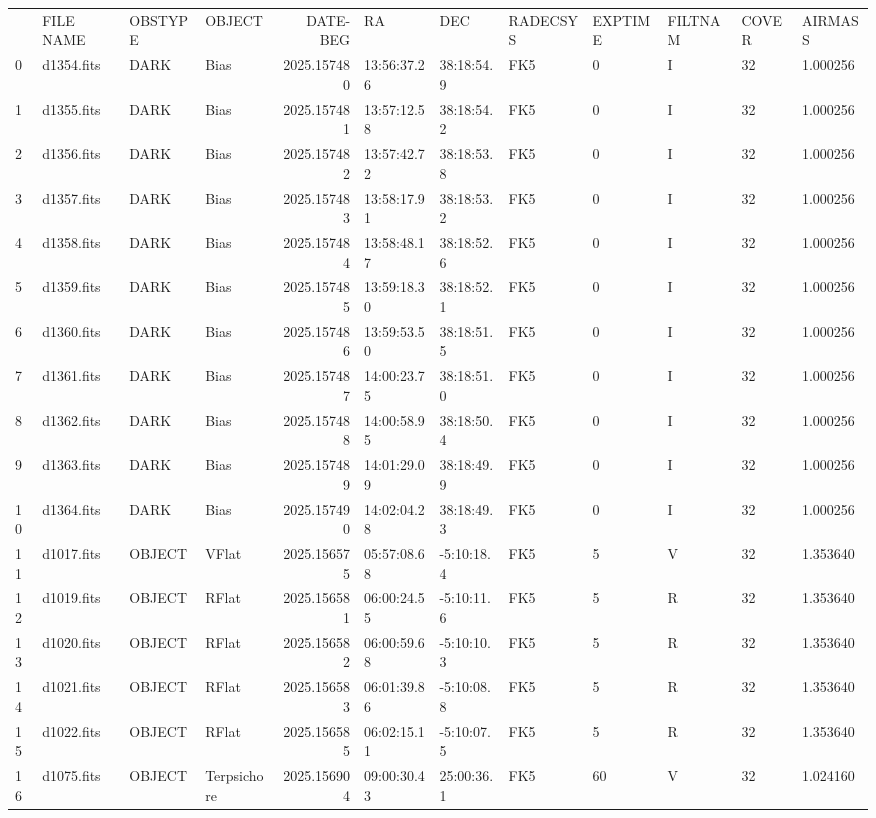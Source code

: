 \begin{tabular}{llllrlllllll}
 & FILE NAME & OBSTYPE & OBJECT & DATE-BEG & RA & DEC & RADECSYS & EXPTIME & FILTNAM & COVER & AIRMASS \\
0 & d1354.fits & DARK & Bias & 2025.157480 & 13:56:37.26 & 38:18:54.9 & FK5 & 0 & I & 32 & 1.000256 \\
1 & d1355.fits & DARK & Bias & 2025.157481 & 13:57:12.58 & 38:18:54.2 & FK5 & 0 & I & 32 & 1.000256 \\
2 & d1356.fits & DARK & Bias & 2025.157482 & 13:57:42.72 & 38:18:53.8 & FK5 & 0 & I & 32 & 1.000256 \\
3 & d1357.fits & DARK & Bias & 2025.157483 & 13:58:17.91 & 38:18:53.2 & FK5 & 0 & I & 32 & 1.000256 \\
4 & d1358.fits & DARK & Bias & 2025.157484 & 13:58:48.17 & 38:18:52.6 & FK5 & 0 & I & 32 & 1.000256 \\
5 & d1359.fits & DARK & Bias & 2025.157485 & 13:59:18.30 & 38:18:52.1 & FK5 & 0 & I & 32 & 1.000256 \\
6 & d1360.fits & DARK & Bias & 2025.157486 & 13:59:53.50 & 38:18:51.5 & FK5 & 0 & I & 32 & 1.000256 \\
7 & d1361.fits & DARK & Bias & 2025.157487 & 14:00:23.75 & 38:18:51.0 & FK5 & 0 & I & 32 & 1.000256 \\
8 & d1362.fits & DARK & Bias & 2025.157488 & 14:00:58.95 & 38:18:50.4 & FK5 & 0 & I & 32 & 1.000256 \\
9 & d1363.fits & DARK & Bias & 2025.157489 & 14:01:29.09 & 38:18:49.9 & FK5 & 0 & I & 32 & 1.000256 \\
10 & d1364.fits & DARK & Bias & 2025.157490 & 14:02:04.28 & 38:18:49.3 & FK5 & 0 & I & 32 & 1.000256 \\
11 & d1017.fits & OBJECT & VFlat & 2025.156575 & 05:57:08.68 & -5:10:18.4 & FK5 & 5 & V & 32 & 1.353640 \\
12 & d1019.fits & OBJECT & RFlat & 2025.156581 & 06:00:24.55 & -5:10:11.6 & FK5 & 5 & R & 32 & 1.353640 \\
13 & d1020.fits & OBJECT & RFlat & 2025.156582 & 06:00:59.68 & -5:10:10.3 & FK5 & 5 & R & 32 & 1.353640 \\
14 & d1021.fits & OBJECT & RFlat & 2025.156583 & 06:01:39.86 & -5:10:08.8 & FK5 & 5 & R & 32 & 1.353640 \\
15 & d1022.fits & OBJECT & RFlat & 2025.156585 & 06:02:15.11 & -5:10:07.5 & FK5 & 5 & R & 32 & 1.353640 \\
16 & d1075.fits & OBJECT & Terpsichore & 2025.156904 & 09:00:30.43 & 25:00:36.1 & FK5 & 60 & V & 32 & 1.024160 \\

\end{tabular}
